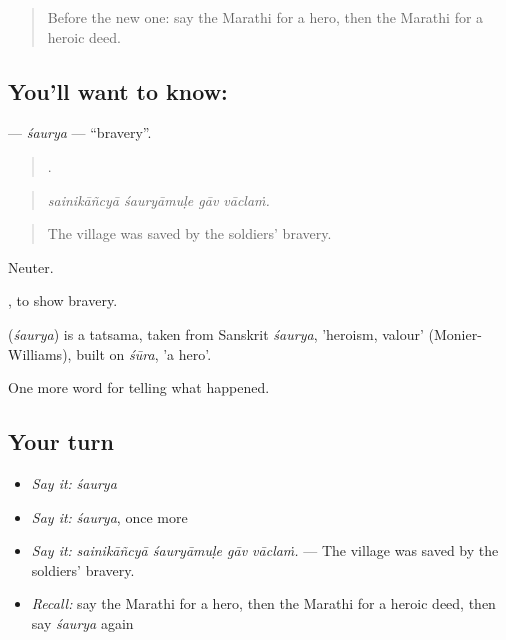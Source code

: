 \label{lesson:MR-C332-saurya}



\begin{quote}
Before the new one: say the Marathi for a hero, then the Marathi for a heroic deed.
\end{quote}

\subsection*{You'll want to know: }
\textbf{} — \emph{śaurya} — \textquotedblleft{}bravery\textquotedblright{}.

\begin{quote}
   .
\end{quote}

\begin{quote}
\emph{sainikāñcyā śauryāmuḷe gāv vāclaṁ.}
\end{quote}

\begin{quote}
The village was saved by the soldiers' bravery.
\end{quote}

Neuter.

 , to show bravery.

\begin{cousinweb}
\textbf{} (\emph{śaurya}) is a tatsama, taken from Sanskrit \emph{śaurya}, 'heroism, valour' (Monier-Williams), built on \emph{śūra}, 'a hero'.
\end{cousinweb}

\begin{grammarlens}[title={What you've built}]
One more word for telling what happened.
\end{grammarlens}

\subsection*{Your turn}
\begin{itemize}
\raggedright
  \item \emph{Say it:} \emph{śaurya}
  \item \emph{Say it:} \emph{śaurya}, once more
  \item \emph{Say it:} \emph{sainikāñcyā śauryāmuḷe gāv vāclaṁ.} — The village was saved by the soldiers' bravery.
  \item \emph{Recall:} say the Marathi for a hero, then the Marathi for a heroic deed, then say \emph{śaurya} again
\end{itemize}

